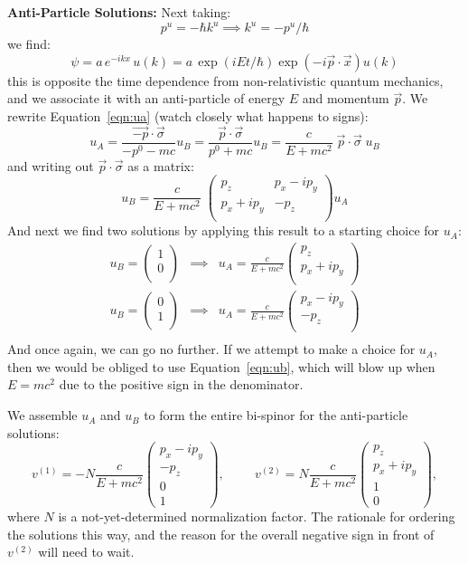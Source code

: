 \documentclass[12pt]{book}
\begin{document}
\noindent
{\bf Anti-Particle Solutions:  } Next taking:
$$p^u = -\hbar k^u \implies k^u = -p^u / \hbar$$
we find:
$$\psi = a \, e^{-ikx} \, u(k) = a \, \exp( iEt/\hbar) \exp(-i\vec{p}\cdot\vec{x}) u(k)$$
this is opposite the time dependence from non-relativistic quantum mechanics, and we associate it with an anti-particle of energy $E$ and momentum $\vec{p}$.  We rewrite Equation~\ref{eqn:ua} (watch closely what happens to signs): 
$$u_A = \frac{\vec{-p}\cdot\vec{\sigma}}{-p^0-mc} u_B = 
\frac{\vec{p}\cdot\vec{\sigma}}{p^0+mc} u_B = \frac{c}{E+mc^2} \; \vec{p}\cdot\vec{\sigma} \; u_B$$
and writing out $\vec{p}\cdot\vec{\sigma}$ as a matrix:
$$u_B = \frac{c}{E+mc^2} \; \begin{pmatrix} p_z & p_x - i p_y \\ p_x + i p_y & -p_z \\ \end{pmatrix} u_A
$$
And next we find two solutions by applying this result to a starting choice for $u_A$:
\begin{eqnarray*}
u_B = \begin{pmatrix} 1 \\ 0 \\ \end{pmatrix} &\implies& 
u_A = \frac{c}{E+mc^2} \begin{pmatrix} p_z \\ p_x + i p_y \\ \end{pmatrix}\\
u_B = \begin{pmatrix} 0 \\ 1 \\ \end{pmatrix} &\implies& 
u_A = \frac{c}{E+mc^2} \begin{pmatrix} p_x - i p_y \\ -p_z \\ \end{pmatrix}\\
\end{eqnarray*}
And once again, we can go no further.  If we attempt to make a choice for $u_A$, then we would be obliged to use Equation~\ref{eqn:ub}, which will blow up when $E=mc^2$ due to the positive sign in the denominator.

We assemble $u_A$ and $u_B$ to form the entire bi-spinor for the anti-particle solutions:
$$v^{(1)} = -N \frac{c}{E+mc^2} \begin{pmatrix} p_x - i p_y \\ -p_z \\ 0 \\ 1 \end{pmatrix}, 
\hspace{1cm}
v^{(2)} = N \frac{c}{E+mc^2} \begin{pmatrix} p_z \\ p_x + i p_y \\ 1 \\ 0 \end{pmatrix}, 
$$
where $N$ is a not-yet-determined normalization factor.
The rationale for ordering the solutions this way, and the reason for the overall negative sign in front of $v^{(2)}$ will need to wait.
\end{document}
